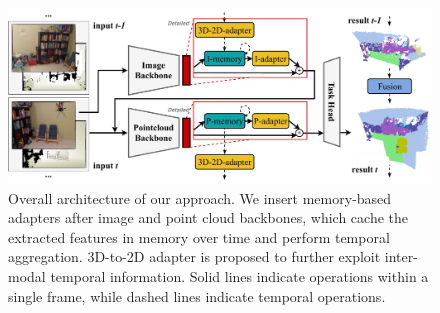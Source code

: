 \begin{figure}[t]
    \centering
    \includegraphics[width=0.9\linewidth]{figures/over-arch-double2.pdf}
    \caption{Overall architecture of our approach. We insert memory-based adapters after image and point cloud backbones, which cache the extracted features in memory over time and perform temporal aggregation. 3D-to-2D adapter is proposed to further exploit inter-modal temporal information. 
    Solid lines indicate operations within a single frame, while dashed lines indicate temporal operations.}
    \label{over-arch}
\end{figure}


